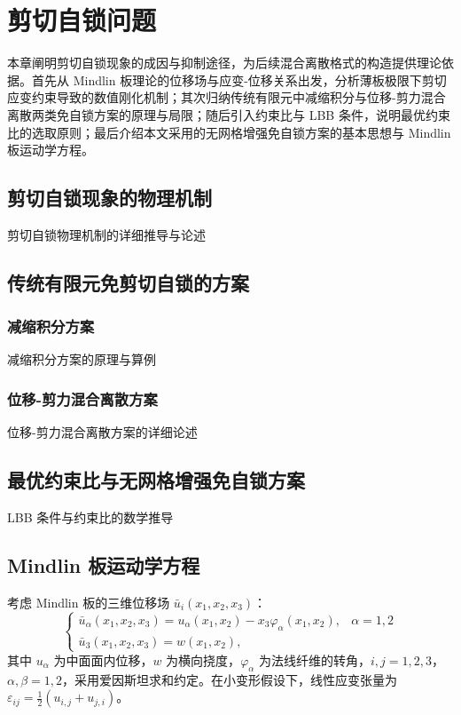\chapter{剪切自锁问题}

本章阐明剪切自锁现象的成因与抑制途径，为后续混合离散格式的构造提供理论依据。首先从 Mindlin 板理论的位移场与应变-位移关系出发，分析薄板极限下剪切应变约束导致的数值刚化机制；其次归纳传统有限元中减缩积分与位移-剪力混合离散两类免自锁方案的原理与局限；随后引入约束比与 LBB 条件，说明最优约束比的选取原则；最后介绍本文采用的无网格增强免自锁方案的基本思想与 Mindlin 板运动学方程。

\section{剪切自锁现象的物理机制}

剪切自锁物理机制的详细推导与论述

\section{传统有限元免剪切自锁的方案}

\subsection{减缩积分方案}

减缩积分方案的原理与算例

\subsection{位移-剪力混合离散方案}

位移-剪力混合离散方案的详细论述

\section{最优约束比与无网格增强免自锁方案}

LBB 条件与约束比的数学推导

\section{Mindlin 板运动学方程}

考虑 Mindlin 板的三维位移场 $\bar{u}_i(x_1,x_2,x_3)$：
\begin{equation}
\begin{cases}
\bar{u}_\alpha(x_1,x_2,x_3) = u_\alpha(x_1,x_2) - x_3\varphi_\alpha(x_1,x_2), & \alpha = 1,2 \\
\bar{u}_3(x_1,x_2,x_3) = w(x_1,x_2),
\end{cases}
\label{eq:mindlin-displacement}
\end{equation}
其中 $u_\alpha$ 为中面面内位移，$w$ 为横向挠度，$\varphi_\alpha$ 为法线纤维的转角，$i,j=1,2,3$，$\alpha,\beta=1,2$，采用爱因斯坦求和约定。在小变形假设下，线性应变张量为 $\varepsilon_{ij} = \frac{1}{2}(u_{i,j}+u_{j,i})$。

